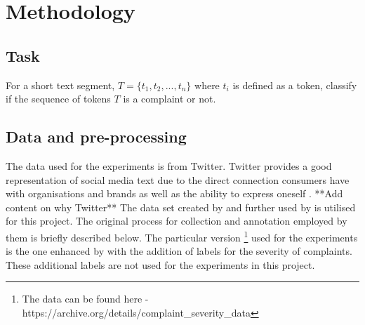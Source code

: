 \chapter{Methodology}

\section{Task}
For a short text segment, $T = \{t_1, t_2, ..., t_n\}$ where $t_i$ is defined as a token, classify if the sequence of tokens $T$ is a complaint or not.

\section{Data and pre-processing}
The data used for the experiments is from Twitter. Twitter provides a good representation of social media text due to the direct connection consumers have with organisations and brands as well as the ability to express oneself \cite{preotiuc-pietro_automatically_2019}. **Add content on why Twitter**
\newline \newline
The data set created by \cite{preotiuc-pietro_automatically_2019} and further used by \cite{jin_complaint_2020} is utilised for this project. The original process for collection and annotation employed by them is briefly described below. The particular version \footnote{The data can be found here - https://archive.org/details/complaint\_severity\_data} used for the experiments is the one enhanced by \cite{jinModelingSeverityComplaints2021} with the addition of labels for the severity of complaints. These additional labels are not used for the experiments in this project.
